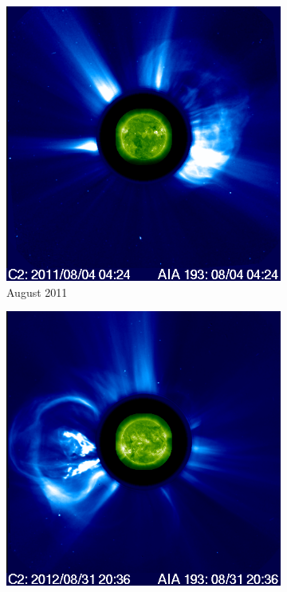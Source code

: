 \begin{figure}[h!]
    \begin{subfigure}[b]{0.3\textwidth}
        \centering
        \includegraphics[width=\textwidth]{images/soho_cme_aug_04_2011_aia193.png}
        \caption[August  2011 CME]{August  2011}
        \label{fig:soho_cme_aug_04_2011}
    \end{subfigure}
    \hfill
    \begin{subfigure}[b]{0.3\textwidth}
        \includegraphics[width=\textwidth]{images/soho_cme_aug_31_2012_aia193.png}

\end{subfigure}
\end{figure}

